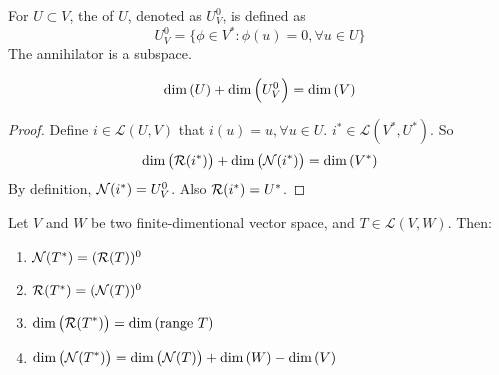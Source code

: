 \begin{definition}
    For $U \subset V$, the  of $U$, denoted as $U^0_V$, is defined as
    \begin{equation*}
        U^0_V = \{ \phi \in V^*: \phi(u) = 0, \forall u \in U \}
    \end{equation*}
    The annihilator is a subspace.
\end{definition}

\begin{theorem}
    \begin{equation}
        \displaystyle \text{dim}\left( U \right) + \displaystyle \text{dim}\left( U_V^0 \right) = \displaystyle \text{dim}\left( V \right)
    \end{equation}
\end{theorem}

\begin{proof}
    Define $i \in \mathcal{L}(U,V)$ that $i(u) = u, \forall u \in U$. $i^* \in \mathcal{L}(V^*,U^*)$. So
    \begin{equation*}
        \displaystyle \text{dim}\left( \mathcal{R}(i^*)  \right) +\displaystyle \text{dim}\left( \mathcal{N}(i^*) \right) = \displaystyle \text{dim}\left( V^* \right)
    \end{equation*}
    By definition, $\mathcal{N}(i^*) = U^0_V$. Also $\mathcal{R}(i^*) = U^*$.
\end{proof}


\begin{theorem}
    Let $V$ and $W$ be two finite-dimentional vector space, and $T \in \mathcal{L}(V,W)$. Then:
    \begin{enumerate}
        \item $\mathcal{N}(T^*)  = (\mathcal{R}(T) )^0$
        \item $\mathcal{R}(T^*) = (\mathcal{N}(T) )^0$
        \item $\displaystyle \text{dim}\left( \mathcal{R}(T^*) \right) = \displaystyle \text{dim}\left( \text{range } T \right)$
        \item $\displaystyle \text{dim}\left( \mathcal{N}(T^*) \right) = \displaystyle \text{dim}\left( \mathcal{N}(T) \right) + \displaystyle \text{dim}\left( W \right) - \displaystyle \text{dim}\left( V \right)$
    \end{enumerate}
\end{theorem}

